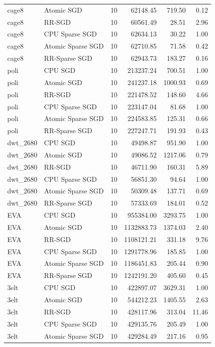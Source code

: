 \begin{tabular}{llrrrr}
cage8 & Atomic SGD & 10 & 62148.45 & 719.50 & 0.12 \\
cage8 & RR-SGD & 10 & 60561.49 & 28.51 & 2.96 \\
cage8 & CPU Sparse SGD & 10 & 62634.13 & 30.22 & 1.00 \\
cage8 & Atomic Sparse SGD & 10 & 62710.85 & 71.58 & 0.42 \\
cage8 & RR-Sparse SGD & 10 & 62943.73 & 183.27 & 0.16 \\
poli & CPU SGD & 10 & 213237.24 & 700.51 & 1.00 \\
poli & Atomic SGD & 10 & 241237.18 & 1000.93 & 0.69 \\
poli & RR-SGD & 10 & 221478.52 & 148.60 & 4.66 \\
poli & CPU Sparse SGD & 10 & 223147.04 & 81.68 & 1.00 \\
poli & Atomic Sparse SGD & 10 & 224583.85 & 125.31 & 0.66 \\
poli & RR-Sparse SGD & 10 & 227247.71 & 191.93 & 0.43 \\
dwt\_2680 & CPU SGD & 10 & 49498.87 & 951.90 & 1.00 \\
dwt\_2680 & Atomic SGD & 10 & 49086.52 & 1217.06 & 0.79 \\
dwt\_2680 & RR-SGD & 10 & 46711.90 & 160.31 & 5.89 \\
dwt\_2680 & CPU Sparse SGD & 10 & 56851.30 & 94.64 & 1.00 \\
dwt\_2680 & Atomic Sparse SGD & 10 & 50309.48 & 137.71 & 0.69 \\
dwt\_2680 & RR-Sparse SGD & 10 & 57333.69 & 184.01 & 0.52 \\
EVA & CPU SGD & 10 & 955384.00 & 3293.75 & 1.00 \\
EVA & Atomic SGD & 10 & 1132883.73 & 1374.03 & 2.40 \\
EVA & RR-SGD & 10 & 1108121.21 & 331.18 & 9.76 \\
EVA & CPU Sparse SGD & 10 & 1291778.96 & 185.85 & 1.00 \\
EVA & Atomic Sparse SGD & 10 & 1186451.83 & 205.44 & 0.90 \\
EVA & RR-Sparse SGD & 10 & 1242191.20 & 405.60 & 0.45 \\
3elt & CPU SGD & 10 & 422897.07 & 3629.31 & 1.00 \\
3elt & Atomic SGD & 10 & 544212.23 & 1405.55 & 2.63 \\
3elt & RR-SGD & 10 & 428117.96 & 313.04 & 11.46 \\
3elt & CPU Sparse SGD & 10 & 429135.76 & 205.49 & 1.00 \\
3elt & Atomic Sparse SGD & 10 & 429284.49 & 217.16 & 0.95 \\

\end{tabular}
